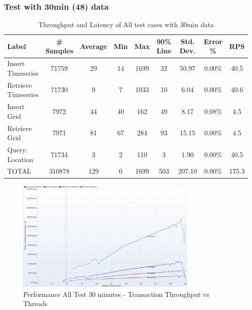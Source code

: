 \subsubsection{Test with 30min (48) data}
\begin{table}[]
\begin{tabulary}{\linewidth}{|L|C|C|C|C|C|C|C|C|}
\hline
Label & \# Samples & Average & Min & Max & 90\% Line & Std. Dev. & Error \% & RPS \\ \hline
Insert Timeseries & 71759 & 29 & 14 & 1699 & 32 & 50.97 & 0.00\% & 40.5 \\ \hline
Retrieve Timeseries & 71730 & 9 & 7 & 1033 & 10 & 6.04 & 0.00\% & 40.6 \\ \hline
Insert Grid & 7972 & 44 & 40 & 162 & 49 & 8.17 & 0.08\% & 4.5 \\ \hline
Retrieve Grid & 7971 & 81 & 67 & 284 & 93 & 15.15 & 0.00\% & 4.5 \\ \hline
Query: Location & 71734 & 3 & 2 & 110 & 3 & 1.90 & 0.00\% & 40.5 \\ \hline
TOTAL & 310878 & 129 & 0 & 1699 & 503 & 207.10 & 0.00\% & 175.3 \\ \hline
\end{tabulary}
\caption{Throughput and Latency of All test cases with 30min data}
\label{tab:obs_all_30_min_summary}
\end{table}

\begin{figure}[htp]
    \centering
    \includegraphics[width=0.8\textwidth]{results/obs/all/obs_all_30m_transaction_throughtput_vs_threads.png}
    \caption{Performance All Test 30 minutes - Transaction Throughput vs Threads}
    \label{fi:test_obs_all_30m_throughtput}
\end{figure}

